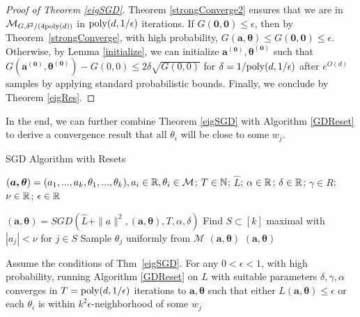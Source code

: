 \fi 
 
\begin{proof}[Proof of Theorem \ref{eigSGD}]
Theorem \ref{strongConverge2} ensures that we are in $\mathcal{M}_{G,\delta^2/(4\mathrm{poly}(d))}$ in $\mathrm{poly}(d,1/\epsilon)$ iterations.
If $G(\boldsymbol{0,0}) \leq \epsilon$, then by Theorem~\ref{strongConverge}, with high probability, $G(\boldsymbol{a,\theta}) \leq G(\boldsymbol{0,0}) \leq \epsilon$. Otherwise, by Lemma \ref{initialize},  we can initialize $\boldsymbol{a^{(0)},\theta^{(0)}}$ such that $G(\boldsymbol{a^{(0)},\theta^{(0)}}) - G(0,0) \leq 2\delta \sqrt{G(0,0)}$ for $\delta = 1/\mathrm{poly}(d,1/\epsilon)$ after $e^{O(d)}$ samples by applying standard probabilistic bounds. Finally, we conclude by Theorem \ref{eigRes}.
\end{proof}
%


In the end, we can further combine Theorem \ref{eigSGD} with Algorithm \ref{GDReset} to derive a convergence result that all $\theta_i$ will be close to some $w_j$.
 
 \begin{algorithm}[tb]
 \caption{SGD Algorithm with Resets}
   \label{GDReset}
\begin{algorithmic}
  $(\boldsymbol{a,\theta}) = (a_1,...,a_k,\theta_1,...,\theta_k), a_i
  \in{\mathbb{R}}, \theta_i\in\mathcal{M}$;
  $T\in {\mathbb{N}}$; $\widehat{L}$; $\alpha\in {\mathbb{R}}$; $\delta \in {\mathbb{R}}$;
  $\gamma \in R$; $\nu \in {\mathbb{R}}$; $\epsilon \in {\mathbb{R}}$ \vspace{0.1in} 
  
   \REPEAT
  \STATE $(\boldsymbol{a},\boldsymbol{\theta}) = SGD \left(\widehat{L} + \|a\|^2, (\boldsymbol{a},\boldsymbol{\theta}),T, \alpha,\delta \right)$
  \STATE Find $S \subset [k]$ maximal with $|a_j| < \nu$ for $j \in S$
    \REPEAT \STATE Sample $\theta_j$
  uniformly from $\mathcal{M}$
    \ENDFOR
  \ELSE
   $(\boldsymbol{a}, \boldsymbol{\theta}) $
  \ENDIF
    $(\boldsymbol{a}, \boldsymbol{\theta}) $
   \end{algorithmic}
\end{algorithm}

\begin{corollary}
Assume the conditions of Thm~\ref{eigSGD}. For any $0 < \epsilon < 1$, with high probability, running Algorithm \ref{GDReset} on $L$ with suitable parameters $\delta, \gamma, \alpha$ converges in $T = \mathrm{poly}(d, 1/\epsilon)$ iterations to $\boldsymbol{a,\theta}$ such that either $L(\boldsymbol{a,\theta}) \leq \epsilon$ or each $\theta_i$ is within $k^2\epsilon$-neighborhood of some $w_j$
\end{corollary}

